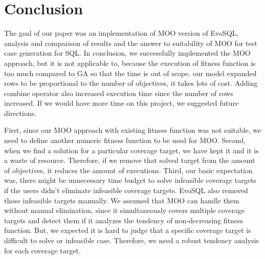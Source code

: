 \chapter{Conclusion}

The goal of our paper was an implementation of MOO version of EvoSQL, analysis and comparison of results and the answer to suitability of MOO for test case generation for SQL.
In conclusion, we successfully implemented the MOO approach, but it is not applicable to, because the execution of fitness function is too much compared to GA so that the time is out of scope. our model expanded rows to be proportional to the number of objectives, it takes lots of cost. Adding combine operator also increased execution time since the number of rows increased. If we would have more time on this project, we suggested future directions.

First, since our MOO approach with existing fitness function was not suitable, we need to define another numeric fitness function to be used for MOO. Second, when we find a solution for a particular coverage target, we have kept it and it is a waste of resource. Therefore, if we remove that solved target from the amount of objectives, it reduces the amount of executions. Third, our basic expectation was, there might be unnecessary time budget to solve infeasible coverage targets if the users didn't eliminate infeasible coverage targets. EvoSQL also removed those infeasible targets manually. We assumed that MOO can handle them without manual elimination, since it simultaneously covers multiple coverage targets and detect them if it analyzes the tendency of non-decreasing fitness function. But, we expected it is hard to judge that a specific coverage target is difficult to solve or infeasible case. Therefore, we need a robust tendency analysis for each coverage target. 
